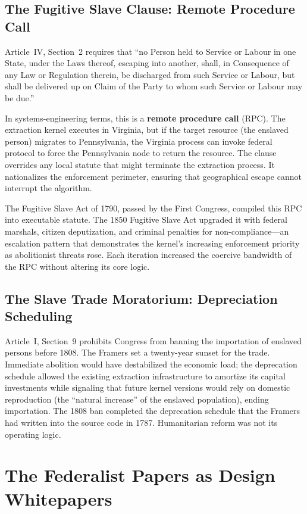 \subsection{The Fugitive Slave Clause: Remote Procedure Call}

Article~IV, Section~2 requires that ``no Person held to Service or Labour in one State, under the Laws thereof, escaping into another, shall, in Consequence of any Law or Regulation therein, be discharged from such Service or Labour, but shall be delivered up on Claim of the Party to whom such Service or Labour may be due.''

In systems-engineering terms, this is a \textbf{remote procedure call} (RPC). The extraction kernel executes in Virginia, but if the target resource (the enslaved person) migrates to Pennsylvania, the Virginia process can invoke federal protocol to force the Pennsylvania node to return the resource. The clause overrides any local statute that might terminate the extraction process. It nationalizes the enforcement perimeter, ensuring that geographical escape cannot interrupt the algorithm.

The Fugitive Slave Act of 1790, passed by the First Congress, compiled this RPC into executable statute. The 1850 Fugitive Slave Act upgraded it with federal marshals, citizen deputization, and criminal penalties for non-compliance---an escalation pattern that demonstrates the kernel's increasing enforcement priority as abolitionist threats rose. Each iteration increased the coercive bandwidth of the RPC without altering its core logic.

\subsection{The Slave Trade Moratorium: Depreciation Scheduling}

Article~I, Section~9 prohibits Congress from banning the importation of enslaved persons before 1808. The Framers set a twenty-year sunset for the trade. Immediate abolition would have destabilized the economic load; the deprecation schedule allowed the existing extraction infrastructure to amortize its capital investments while signaling that future kernel versions would rely on domestic reproduction (the ``natural increase'' of the enslaved population), ending importation. The 1808 ban completed the deprecation schedule that the Framers had written into the source code in 1787. Humanitarian reform was not its operating logic.

\section{The Federalist Papers as Design Whitepapers}

